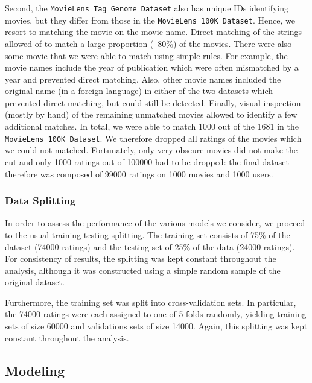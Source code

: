 \documentclass[bj, preprint]{imsart}
\begin{document}
Second, the \texttt{MovieLens Tag Genome Dataset} also has unique IDs identifying movies, but they differ from those in the \texttt{MovieLens 100K Dataset}. 
Hence, we resort to matching the movie on the movie name. 
Direct matching of the strings allowed of to match a large proportion (~80\%) of the movies. 
There were also some movie that we were able to match using simple rules. 
For example, the movie names include the year of publication which were often mismatched by a year and prevented direct matching. 
Also, other movie names included the original name (in a foreign language) in either of the two datasets which prevented direct matching, but could still be detected. 
Finally, visual inspection (mostly by hand) of the remaining unmatched movies allowed to identify a few additional matches.
In total, we were able to match \num{1000} out of the \num{1681} in the \texttt{MovieLens 100K Dataset}. 
We therefore dropped all ratings of the movies which we could not matched. Fortunately, only very obscure movies did not make the cut and only \num{1000} ratings out of \num{100000} had to be dropped: the final dataset therefore was composed of \num{99000} ratings on \num{1000} movies and \num{1000} users. 

\subsubsection{Data Splitting}\label{subsubsec:method.preprocess.split}

In order to assess the performance of the various models we consider, we proceed to the usual training-testing splitting. The training set consists of 75\% of the dataset (\num{74000} ratings) and the testing set of 25\% of the data (\num{24000} ratings). For consistency of results, the splitting was kept constant throughout the analysis, although it was constructed using a simple random sample of the original dataset.

Furthermore, the training set was split into cross-validation sets. In particular, the \num{74000} ratings were each assigned to one of 5 folds randomly, yielding training sets of size \num{60000} and validations sets of size \num{14000}. Again, this splitting was kept constant throughout the analysis.

\subsection{Modeling}\label{subsec:method.models}
\end{document}
